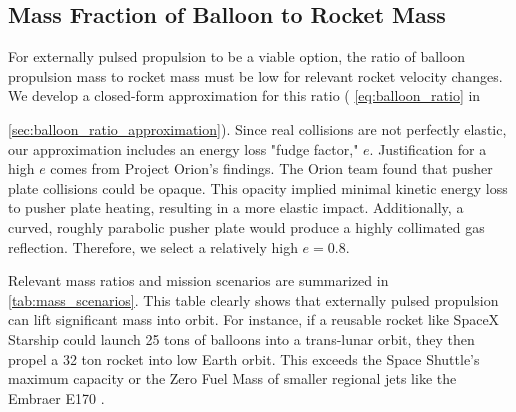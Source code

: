 \documentclass{article}
\begin{document}
\subsection{Mass Fraction of Balloon to Rocket Mass}
For externally pulsed propulsion to be a viable option, the ratio of balloon propulsion mass to rocket mass must be low for relevant rocket velocity changes. We develop a closed-form approximation for this ratio ( \autoref{eq:balloon_ratio} in {\autoref{sec:balloon_ratio_approximation}). Since real collisions are not perfectly elastic, our approximation includes an energy loss "fudge factor," \(e\).  Justification for a high \(e\) comes from Project Orion's findings\cite{orion_reflections}.   The Orion team found that pusher plate collisions could be opaque. This opacity implied minimal kinetic energy loss to pusher plate heating, resulting in a more elastic impact. Additionally, a curved, roughly parabolic pusher plate would produce a  highly collimated gas reflection. Therefore, we select a relatively high  \(e=0.8\).   

Relevant mass ratios and mission scenarios are summarized in \autoref{tab:mass_scenarios}. This table clearly shows that externally pulsed propulsion can lift significant mass into orbit. For instance, if a reusable rocket like SpaceX Starship \cite{starship} could launch 25 tons of balloons into a trans-lunar orbit, they then propel a 32 ton rocket into low Earth orbit. This exceeds the Space Shuttle's maximum capacity \cite{space_shuttle_program} or the Zero Fuel Mass of smaller regional jets like the Embraer E170 \cite{embraer_e170}.



}
\end{document}

